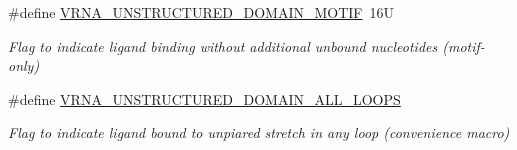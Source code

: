 \begin{DoxyCompactItemize}
\mbox{\label{group__domains__up_gaab12b58d59be76446a9f76fad2fe624c}} 
\#define \mbox{\hyperlink{group__domains__up_gaab12b58d59be76446a9f76fad2fe624c}{V\+R\+N\+A\+\_\+\+U\+N\+S\+T\+R\+U\+C\+T\+U\+R\+E\+D\+\_\+\+D\+O\+M\+A\+I\+N\+\_\+\+M\+O\+T\+IF}}~16U
\begin{DoxyCompactList}\small\item\em Flag to indicate ligand binding without additional unbound nucleotides (motif-\/only) \end{DoxyCompactList}\item 
\mbox{\label{group__domains__up_ga3c6be4cce70f1af9e885788856101699}} 
\#define \mbox{\hyperlink{group__domains__up_ga3c6be4cce70f1af9e885788856101699}{V\+R\+N\+A\+\_\+\+U\+N\+S\+T\+R\+U\+C\+T\+U\+R\+E\+D\+\_\+\+D\+O\+M\+A\+I\+N\+\_\+\+A\+L\+L\+\_\+\+L\+O\+O\+PS}}
\begin{DoxyCompactList}\small\item\em Flag to indicate ligand bound to unpiared stretch in any loop (convenience macro) \end{DoxyCompactList}\end{DoxyCompactItemize}
